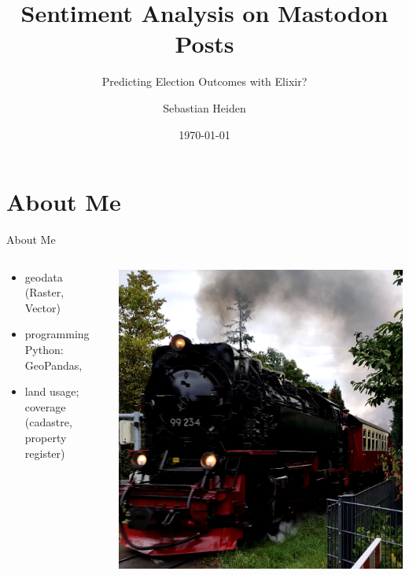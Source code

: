 \documentclass[usenames,dvipsnames,aspectratio=169]{beamer}
\title{Sentiment Analysis on Mastodon Posts}
\subtitle{Predicting Election Outcomes with Elixir?}
\author{Sebastian Heiden}
\institute{Harz University of Applied Sciences}
\date{\today}
\begin{document}
	
	{
		\begin{frame}
			\titlepage
		\end{frame}
	}
	
	
	\section{About Me}
	\begin{frame}{About Me}
		\begin{columns}
			
			\begin{column}{0.45\textwidth}
				\begin{tcolorbox}[colback=white, colframe=ElixirPurple, arc=3mm, boxrule=0mm, height=0.8\textheight, valign=center, title=Working Live]
					
					\begin{itemize}
						\item geodata (Raster, Vector)
						\item programming Python: GeoPandas, 
						\item land usage; coverage (cadastre, property register)
					\end{itemize}
				\end{tcolorbox}
			\end{column}
			
			\begin{column}{0.45\textwidth}
				\begin{tcolorbox}[colback=white, colframe=ElixirPurple, arc=3mm, boxrule=0mm, height=0.8\textheight, valign=center, title=Privat Live]
					\includegraphics[width=\tcbtextwidth,   keepaspectratio]{vlcsnap-2024-01-31-23h37m06s479.png}
				\end{tcolorbox}
			\end{column}
			

\end{columns}
\end{frame}
\end{document}
